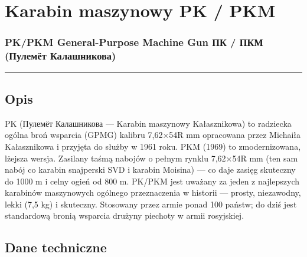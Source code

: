 \documentclass[12pt,openany,oneside]{book}
\begin{document}
\chapter{Karabin maszynowy PK / PKM}\label{karabin-maszynowy-pk-pkm}

\subsection{PK/PKM General-Purpose Machine Gun \textbar{} ПК / ПКМ
(Пулемёт
Калашникова)}\label{pkpkm-general-purpose-machine-gun-ux43fux43a-ux43fux43aux43c-ux43fux443ux43bux435ux43cux451ux442-ux43aux430ux43bux430ux448ux43dux438ux43aux43eux432ux430}

\begin{center}\rule{0.5\linewidth}{0.5pt}\end{center}

\section{Opis}\label{opis-56}

PK (Пулемёт Калашникова --- Karabin maszynowy Kałasznikowa) to radziecka
ogólna broń wsparcia (GPMG) kalibru 7,62×54R mm opracowana przez
Michaiła Kałasznikowa i przyjęta do służby w 1961 roku. PKM (1969) to
zmodernizowana, lżejsza wersja. Zasilany taśmą nabojów o pełnym rynklu
7,62×54R mm (ten sam nabój co karabin snajperski SVD i karabin Moisina)
--- co daje zasięg skuteczny do 1000 m i celny ogień od 800 m. PK/PKM
jest uważany za jeden z najlepszych karabinów maszynowych ogólnego
przeznaczenia w historii --- prosty, niezawodny, lekki (7,5 kg) i
skuteczny. Stosowany przez armie ponad 100 państw; do dziś jest
standardową bronią wsparcia drużyny piechoty w armii rosyjskiej.

\section{Dane techniczne}\label{dane-techniczne-56}
\end{document}

